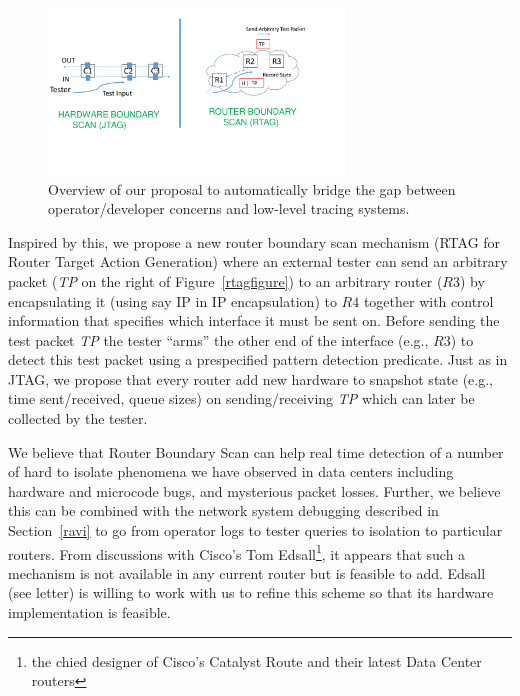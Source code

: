  \begin{figure}[t]
\centering
\includegraphics[width=0.7\textwidth]{RTAG.pdf}
\caption{Overview of our proposal to automatically bridge the gap between
operator/developer concerns and low-level tracing systems.}
\label{fig:rtagfigure}
\end{figure}

 Inspired by this, we propose a new router boundary scan mechanism (RTAG for Router Target Action Generation) where an
 external tester can send an arbitrary packet ({\em TP}  on the right of Figure~\ref{rtagfigure}) to an arbitrary router ($R3$) 
 by encapsulating it (using say IP in IP encapsulation) to $R4$ together with control information that specifies which interface
 it must be sent on.  Before sending the test packet {\em TP} the tester ``arms'' the other end of the interface (e.g., $R3$) to
 detect this test packet using a prespecified pattern detection predicate.  Just as in JTAG, we propose that every router add
 new hardware to snapshot state (e.g., time sent/received, queue sizes) on sending/receiving {\em TP} which can later be collected by the
 tester.
 
 We believe that Router Boundary Scan can help real time detection of a number of hard to isolate phenomena we have observed
 in data centers including hardware and microcode bugs, and mysterious packet losses.  Further, we believe this can be combined
 with the network system debugging described in Section~\ref{ravi} to go from operator logs to tester queries to isolation to particular
 routers.  From discussions with Cisco's Tom Edsall\footnote{the chied designer of Cisco's Catalyst Route and their latest Data Center routers}, it appears that such a mechanism is not available in any current router but is feasible to add. Edsall (see letter) is willing to work with us to refine this scheme so
 that its hardware implementation is feasible.
 
